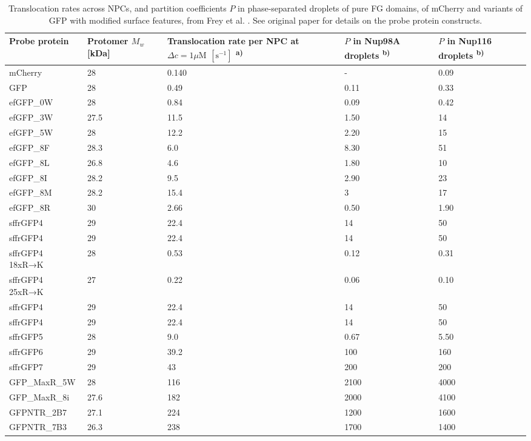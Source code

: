 \documentclass[10pt, a4paper, twocolumn]{article}
\begin{document}
\begin{table*}[h]
\begin{minipage}{\linewidth}
\centering
\caption{Translocation rates across NPCs, and partition coefficients $P$ in phase-separated droplets of pure FG domains, of mCherry and variants of GFP with modified surface features, from Frey et al. \cite{Frey2018}.
See original paper for details on the probe protein constructs.}
\label{tbl:attr_probes}
\begin{tabular}{p{4cm}|p{2cm}|p{4.1cm}|p{2cm}|p{2cm}}
Probe protein & Protomer $M_w$ [kDa] & Translocation rate per NPC at $\Delta c = 1\mu\text{M}$ $[\text{s}^{-1}]$ \textsuperscript{a)} & $P$ in Nup98A droplets \textsuperscript{b)} & $P$ in Nup116 droplets \textsuperscript{b)} \\
\hline
mCherry & 28 & 0.140 & - & 0.09 \\
GFP & 28 & 0.49 & 0.11 & 0.33 \\
efGFP\_0W & 28 & 0.84 & 0.09 & 0.42 \\
efGFP\_3W & 27.5 & 11.5 & 1.50 & 14 \\
efGFP\_5W & 28 & 12.2 & 2.20 & 15 \\
efGFP\_8F & 28.3 & 6.0 & 8.30 & 51 \\
efGFP\_8L & 26.8 & 4.6 & 1.80 & 10 \\
efGFP\_8I & 28.2 & 9.5 & 2.90 & 23 \\
efGFP\_8M & 28.2 & 15.4 & 3 & 17 \\
efGFP\_8R & 30 & 2.66 & 0.50 & 1.90 \\
sffrGFP4 & 29 & 22.4 & 14 & 50 \\
sffrGFP4 & 29 & 22.4 & 14 & 50 \\
sffrGFP4 18xR→K & 28 & 0.53 & 0.12 & 0.31 \\
sffrGFP4 25xR→K & 27 & 0.22 & 0.06 & 0.10 \\
sffrGFP4 & 29 & 22.4 & 14 & 50 \\
sffrGFP4 & 29 & 22.4 & 14 & 50 \\
sffrGFP5 & 28 & 9.0 & 0.67 & 5.50 \\
sffrGFP6 & 29 & 39.2 & 100 & 160 \\
sffrGFP7 & 29 & 43 & 200 & 200 \\
GFP\_MaxR\_5W & 28 & 116 & 2100 & 4000 \\
GFP\_MaxR\_8i & 27.6 & 182 & 2000 & 4100 \\
GFPNTR\_2B7 & 27.1 & 224 & 1200 & 1600 \\
GFPNTR\_7B3 & 26.3 & 238 & 1700 & 1400 \\

\end{tabular}
\end{minipage}
\end{table*}
\end{document}
